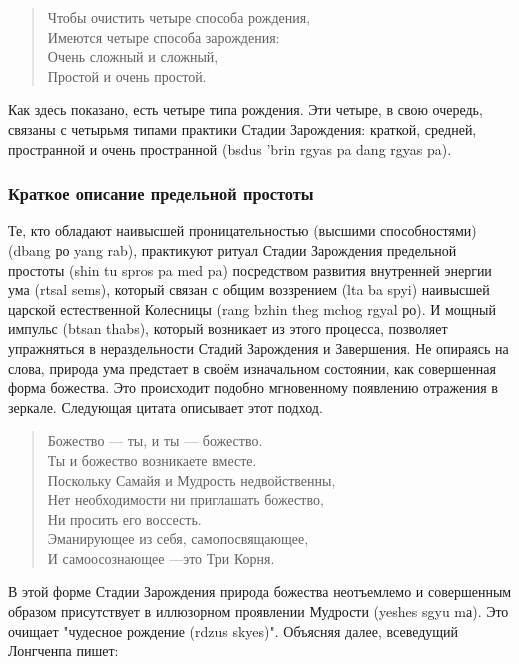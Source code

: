 \begin{verse}
Чтобы очистить четыре способа рождения,\\
Имеются четыре способа зарождения:\\
Очень сложный и сложный,\\
Простой и очень простой.
\end{verse}

\begin{siderules}
Как здесь показано, есть четыре типа рождения. Эти четыре, в свою очередь, связаны с
четырьмя типами практики Стадии Зарождения: краткой, средней, пространной и очень
пространной (bsdus 'brin rgyas pa dang rgyas pa).
\end{siderules}

\subsubsection{Краткое описание предельной простоты}

Те, кто обладают наивысшей проницательностью (высшими способностями) (dbang ро
yang rab), практикуют ритуал Стадии Зарождения предельной простоты (shin tu spros pa med
pa) посредством развития внутренней энергии ума (rtsal sems), который связан с общим
воззрением (lta ba spyi) наивысшей царской естественной Колесницы (rang bzhin theg mchog
rgyal ро). И мощный импульс (btsan thabs), который возникает из этого процесса, позволяет
упражняться в нераздельности Стадий Зарождения и Завершения. Не опираясь на слова,
природа ума предстает в своём изначальном состоянии, как совершенная форма божества.
Это происходит подобно мгновенному появлению отражения в зеркале. Следующая цитата
описывает этот подход.

\begin{verse}
Божество — ты, и ты — божество.\\
Ты и божество возникаете вместе.\\
Поскольку Самайя и Мудрость недвойственны,\\
Нет необходимости ни приглашать божество,\\
Ни просить его воссесть.\\
Эманирующее из себя, самопосвящающее,\\
И самоосознающее —это Три Корня.\\
\end{verse}

В этой форме Стадии Зарождения природа божества неотъемлемо и совершенным
образом присутствует в иллюзорном проявлении Мудрости (yeshes sgyu mа).
Это очищает "чудесное рождение (rdzus skyes)". Объясняя далее, всеведущий Лонгченпа пишет:

